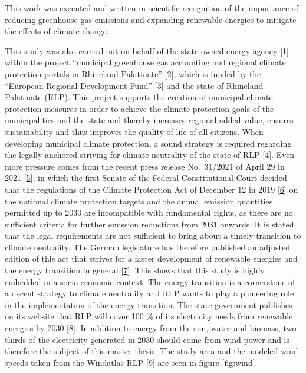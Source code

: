 \documentclass[a4paper,11pt]{article}
\begin{document}
This work was executed and written in scientific recognition of the importance of reducing greenhouse gas emissions and expanding renewable energies to mitigate the effects of climate change.

This study was also carried out on behalf of the state-owned energy agency {[}\protect\hyperlink{ref-EnergieagenturRheinlandPfalz.2021}{1}{]} within the project ``municipal greenhouse gas accounting and regional climate protection portals in Rhineland-Palatinate'' {[}\protect\hyperlink{ref-KomBiReK.2021}{2}{]}, which is funded by the ``European Regional Development Fund'' {[}\protect\hyperlink{ref-EuropeanRegionalDevelopmentFund.2021}{3}{]} and the state of Rhineland-Palatinate (RLP). This project supports the creation of municipal climate protection measures in order to achieve the climate protection goals of the municipalities and the state and thereby increases regional added value, ensures sustainability and thus improves the quality of life of all citizens. When developing municipal climate protection, a sound strategy is required regarding the legally anchored striving for climate neutrality of the state of RLP {[}\protect\hyperlink{ref-RheinlandPfalz.19.08.2014}{4}{]}. Even more pressure comes from the recent press release No.~31/2021 of April 29 in 2021 {[}\protect\hyperlink{ref-Bundesverfassungsgericht.24.03.2021}{5}{]}, in which the first Senate of the Federal Constitutional Court decided that the regulations of the Climate Protection Act of December 12 in 2019 {[}\protect\hyperlink{ref-BundesamtfurJustiz.2019}{6}{]} on the national climate protection targets and the annual emission quantities permitted up to 2030 are incompatible with fundamental rights, as there are no sufficient criteria for further emission reductions from 2031 onwards. It is stated that the legal requirements are not sufficient to bring about a timely transition to climate neutrality. The German legislature has therefore published an adjusted edition of this act that strives for a faster development of renewable energies and the energy transition in general {[}\protect\hyperlink{ref-BundesministeriumfurUmweltNaturschutzundnukleareSicherheit.12.05.2021}{7}{]}. This shows that this study is highly embedded in a socio-economic context. The energy transition is a cornerstone of a decent strategy to climate neutrality and RLP wants to play a pioneering role in the implementation of the energy transition. The state government publishes on its website that RLP will cover 100 \% of its electricity needs from renewable energies by 2030 {[}\protect\hyperlink{ref-LandesregierungRheinlandPfalz.2021}{8}{]}. In addition to energy from the sun, water and biomass, two thirds of the electricity generated in 2030 should come from wind power and is therefore the subject of this master thesis. The study area and the modeled wind speeds taken from the Windatlas RLP {[}\protect\hyperlink{ref-MinisteriumfurWirtschaftKlimaschutzEnergieundLandesplanung.2013}{9}{]} are seen in figure \ref{fig:wind}.
\end{document}

